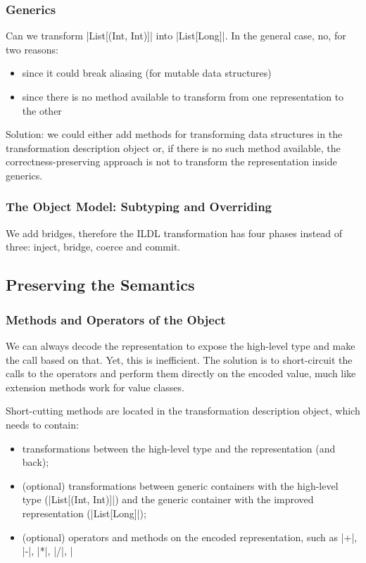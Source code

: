 \subsubsection{Generics}

Can we transform |List[(Int, Int)]| into |List[Long]|. In the general case, no, for two reasons:
\begin{itemize}
  \item since it could break aliasing (for mutable data structures)
  \item since there is no method available to transform from one representation to the other
\end{itemize}

Solution: we could either add methods for transforming data structures in the transformation description object or, if there is no such method available, the correctness-preserving approach is not to transform the representation inside generics.


\subsubsection{The Object Model: Subtyping and Overriding}
We add bridges, therefore the ILDL transformation has four phases instead of three: inject, bridge, coerce and commit.


\subsection{Preserving the Semantics}
\label{sec:ildl:semantics}

\subsubsection{Methods and Operators of the Object}
We can always decode the representation to expose the high-level type and make the call based on that. Yet, this is inefficient. The solution is to short-circuit the calls to the operators and perform them directly on the encoded value, much like extension methods work for value classes.

Short-cutting methods are located in the transformation description object, which needs to contain:
\begin{itemize}
  \item transformations between the high-level type and the representation (and back);
  \item (optional) transformations between generic containers with the high-level type (|List[(Int, Int)]|) and the generic container with the improved representation (|List[Long]|);
  \item (optional) operators and methods on the encoded representation, such as |+|, |-|, |*|, |/|, |%
\end{itemize}


